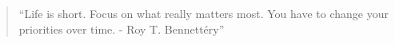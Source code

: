 
\begin{quote}
``Life is short. Focus on what really matters most. You have to change your priorities over time. - Roy T. Bennett\'{e}ry''
\end{quote}



\divider\smallskip




